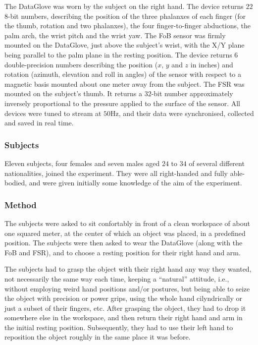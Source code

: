 The DataGlove was worn by the subject on the right hand. The device
returns $22$ $8$-bit numbers, describing the position of the three
phalanxes of each finger (for the thumb, rotation and two phalanxes),
the four finger-to-finger abductions, the palm arch, the wrist pitch
and the wrist yaw. The FoB sensor was firmly mounted on the DataGlove,
just above the subject's wrist, with the X/Y plane being parallel to
the palm plane in the resting position. The device returns $6$
double-precision numbers describing the position ($x$, $y$ and $z$ in
inches) and rotation (azimuth, elevation and roll in angles) of the
sensor with respect to a magnetic basis mounted about one meter away
from the subject. The FSR was mounted on the subject's thumb. It
returns a $32$-bit number approximately inversely proportional to the
pressure applied to the surface of the sensor. All devices were tuned
to stream at $50$Hz, and their data were synchronised, collected and
saved in real time.

\subsubsection*{Subjects}

Eleven subjects, four females and seven males aged $24$ to $34$ of
several different nationalities, joined the experiment. They were all
right-handed and fully able-bodied, and were given initially some
knowledge of the aim of the experiment.

\subsubsection*{Method}

The subjects were asked to sit confortably in front of a clean
workspace of about one squared meter, at the center of which an object
was placed, in a predefined position. The subjects were then asked to
wear the DataGlove (along with the FoB and FSR), and to choose a
resting position for their right hand and arm.

The subjects had to grasp the object with their right hand any way
they wanted, not necessarily the same way each time, keeping a
``natural'' attitude, i.e., without employing weird hand positions
and/or postures, but being able to seize the object with precision or
power grips, using the whole hand cilyndrically or just a subset of
their fingers, etc. After grasping the object, they had to drop it
somewhere else in the workspace, and then return their right hand and
arm in the initial resting position. Subsequently, they had to use
their left hand to reposition the object roughly in the same place it
was before.

